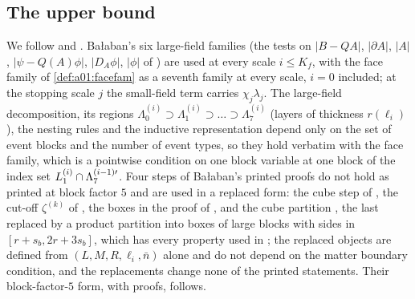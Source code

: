 \subsection{The upper bound}\label{app:a01:upper}

We follow \cite[Sects.~2--3]{Ba2} and \cite[Sect.~5.2]{K2}. Ba{\l}aban's six large-field families (the tests on $|B-QA|$, $|\partial A|$, $|A|$, $|\psi-Q(A)\phi|$, $|D_A\phi|$, $|\phi|$ of \cite[(2.2)]{Ba2}) are used at every scale $i\le K_f$, with the face family of \cref{def:a01:facefam} as a seventh family at every scale, $i=0$ included; at the stopping scale $j$ the small-field term carries $\chi_j\lambda_j$. The large-field decomposition, its regions $\Lambda_0^{(i)}\supset\Lambda_1^{(i)}\supset\dots\supset\Lambda_7^{(i)}$ (layers of thickness $r(\ell_i)$), the nesting rules and the inductive representation \cite[(2.43)--(2.52)]{Ba2} depend only on the set of event blocks and the number of event types, so they hold verbatim with the face family, which is a pointwise condition on one block variable at one block of the index set $L_{1}^{(i)}\cap\Lambda_7^{(i-1)\prime}$. Four steps of Ba{\l}aban's printed proofs do not hold as printed at block factor $5$ and are used in a replaced form: the cube step of \cite[p.~433]{Ba3}, the cut-off $\zeta^{(k)}$ of \cite[(2.44)]{Ba2}, the boxes in the proof of \cite[Lemma~2.4]{Ba2}, and the cube partition \cite[(3.43)--(3.45)]{Ba2}, the last replaced by a product partition into boxes of large blocks with sides in $[r+s_b,2r+3s_b]$, which has every property used in \cite[Sect.~3C]{Ba2}; the replaced objects are defined from $(L,M,R,\ell_i,\bar n)$ alone and do not depend on the matter boundary condition, and the replacements change none of the printed statements. Their block-factor-$5$ form, with proofs, follows.




